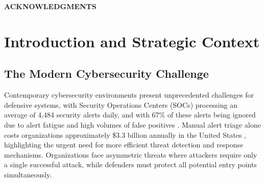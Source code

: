 \documentclass[12pt,oneside]{article}
\begin{document}
\clearpage
\begin{center}
\large\textbf{ACKNOWLEDGMENTS}
\end{center}

\clearpage

\listoffigures
\clearpage

\listoftables
\clearpage

\setcounter{page}{1}
\pagestyle{fancy}
\fancyhf{}
\fancyfoot[C]{\thepage}


\section{Introduction and Strategic Context}

\subsection{The Modern Cybersecurity Challenge}


Contemporary cybersecurity environments present unprecedented challenges for defensive systems, with Security Operations Centers (SOCs) processing an average of 4,484 security alerts daily, and with 67\% of these alerts being ignored due to alert fatigue and high volumes of false positives \cite{vectra2023threat}. Manual alert triage alone costs organizations approximately \$3.3 billion annually in the United States \cite{vectra2023threat}, highlighting the urgent need for more efficient threat detection and response mechanisms. Organizations face asymmetric threats where attackers require only a single successful attack, while defenders must protect all potential entry points simultaneously. 
\end{document}
